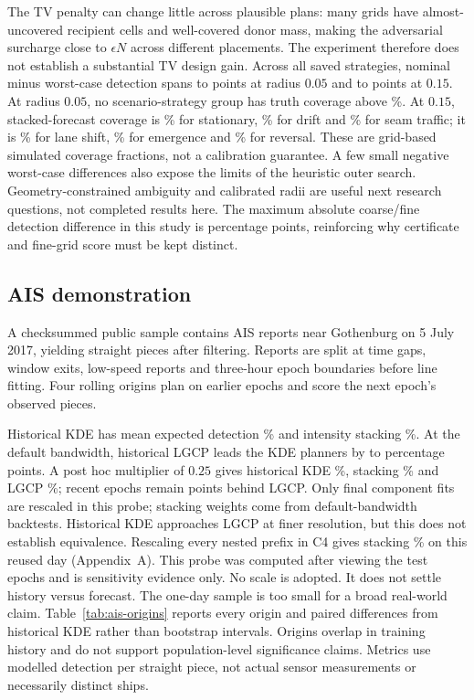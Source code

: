 \documentclass[11pt]{article}
\begin{document}
The TV penalty can change little across plausible plans: many grids have
almost-uncovered recipient cells and well-covered donor mass, making the
adversarial surcharge close to $\epsilon N$ across different placements.
The experiment therefore does not establish a substantial TV design gain.
Across all saved strategies, nominal minus worst-case detection spans
\tvPenaltyFiveMin{} to \tvPenaltyFiveMax{} points at radius $0.05$ and
\tvPenaltyFifteenMin{} to \tvPenaltyFifteenMax{} points at $0.15$.
At radius $0.05$, no scenario-strategy group has truth coverage above
\tvSmallCoverageMax\%. At $0.15$, stacked-forecast coverage is
\tvCoverageStationary\% for stationary, \tvCoverageDrift\% for drift and
\tvCoverageSeamDrift\% for seam traffic; it is \tvCoverageLaneShift\%
for lane shift, \tvCoverageEmergence\% for emergence and
\tvCoverageReversal\% for reversal. These are grid-based simulated
coverage fractions, not a calibration guarantee.
A few small negative worst-case differences also expose the limits of the
heuristic outer search. Geometry-constrained ambiguity and calibrated radii
are useful next research questions, not completed results here.
The maximum absolute coarse/fine detection difference in this study is
\robustGridErrorMax{} percentage points, reinforcing why certificate and
fine-grid score must be kept distinct.
\FloatBarrier

\subsection{AIS demonstration}
A checksummed public sample contains \aisReports{} AIS reports near
Gothenburg on 5 July 2017, yielding \aisLines{} straight pieces after
filtering. Reports are split at time gaps, window exits, low-speed reports
and three-hour epoch boundaries before line fitting. Four rolling origins
plan on earlier epochs and score the next epoch's observed pieces.

Historical KDE has mean expected detection \aisPooled\% and intensity
stacking \aisStacked\%. At the default bandwidth, historical LGCP leads the KDE planners by
\aisBandwidthGapMin{} to \aisBandwidthGapMax{} percentage points.
A post hoc multiplier of $0.25$ gives historical KDE \aisFinePooled\%,
stacking \aisFineStacked\% and LGCP \aisFineLgcp\%; recent epochs remain
\aisFineRecentGap{} points behind LGCP. Only final component fits are rescaled
in this probe; stacking weights come from default-bandwidth backtests.
Historical KDE approaches LGCP at finer resolution, but this does not
establish equivalence. Rescaling every nested prefix in C4 gives stacking
\aisNestedStacked\% on this reused day (Appendix~A).
This probe was computed after viewing the test epochs and is sensitivity
evidence only. No scale is adopted. It does not settle history versus forecast. The one-day sample is too small for a broad
real-world claim. Table~\ref{tab:ais-origins} reports every origin and
paired differences from historical KDE rather than bootstrap intervals.
Origins overlap in training history and do not support population-level
significance claims. Metrics use modelled detection per straight piece,
not actual sensor measurements or necessarily distinct ships.
\end{document}
